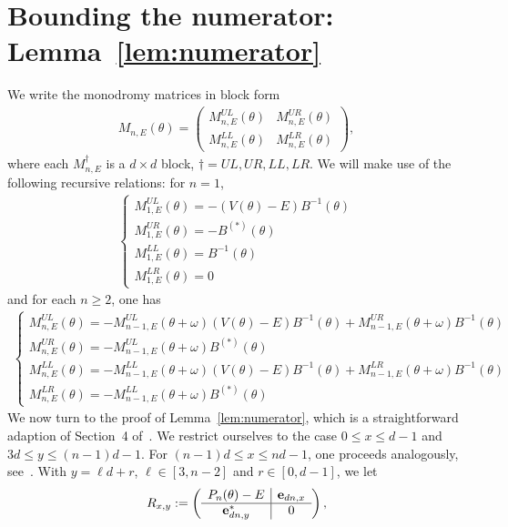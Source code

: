 \documentclass[11pt]{amsart}
\begin{document}
\section{Bounding the numerator: Lemma~\ref{lem:numerator}}
\label{sec:Zaehler}
We write the monodromy matrices in block form
\begin{align}
M_{n,E}(\theta) =\left(\begin{array}{c|c}
M_{n,E}^{UL}(\theta)  & M_{n,E}^{UR}(\theta) \\
\hline
M_{n,E}^{LL}(\theta)  & M_{n,E}^{LR}(\theta)
\end{array}\right),
\end{align}
where each $M_{n,E}^{\dagger}$ is a $d\times d$ block, $\dagger=UL, UR, LL, LR$.
We will make use of the following recursive relations: for $n=1$,
\begin{align}\label{eq:rec1}
\begin{cases}
M_{1,E}^{UL}(\theta) =-(V(\theta) -E)B^{-1}(\theta)\\
M_{1,E}^{UR}(\theta) =-B^{(*)}(\theta)\\
M_{1,E}^{LL}(\theta) =B^{-1}(\theta)\\
M_{1,E}^{LR}(\theta) =0
\end{cases}
\end{align}
and for each $n\geq 2$, one has 
\begin{align}\label{eq:rec2}
\begin{cases}
M_{n,E}^{UL}(\theta)=-M_{n-1,E}^{UL}(\theta+\omega) (V(\theta)-E)B^{-1}(\theta)+M_{n-1,E}^{UR}(\theta+\omega) B^{-1}(\theta)\\
M_{n,E}^{UR}(\theta)=-M_{n-1,E}^{UL}(\theta+\omega) B^{(*)}(\theta)\\
M_{n,E}^{LL}(\theta)=-M_{n-1,E}^{LL}(\theta+\omega) (V(\theta)-E)B^{-1}(\theta)+M_{n-1,E}^{LR}(\theta+\omega)B^{-1}(\theta)\\
M_{n,E}^{LR}(\theta)=-M_{n-1,E}^{LL}(\theta+\omega) B^{(*)}(\theta)
\end{cases}
\end{align}
We now turn to the proof of Lemma~\ref{lem:numerator}, which is a straightforward adaption of Section~4 of~\cite{HS3}. 
We restrict ourselves to the case $0\leq x\leq d-1$ and $3d\leq y\leq (n-1)d-1$. For $(n-1)d\leq x\leq nd-1$, one proceeds analogously, see~\cite{HS3}. 
With  $y=\ell d+r$, $\ell\in [3,n-2]$ and $r\in [0,d-1]$, we let 
\begin{align}
R_{x,y}:=\left(\begin{array}{c|c}
P_n(\theta)-E & {\bf e}_{dn,x}\\
\hline
{\bf e}_{dn,y}^{*} & 0
\end{array}\right),
\end{align}
\end{document}
